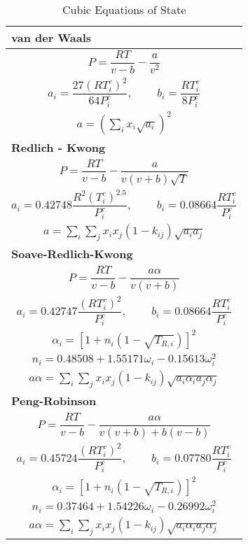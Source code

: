 \begin{table}
			\caption{Cubic Equations of State}\label{CubicEOSTable}
			\begin{center}
			\begin{tabularx}{\textwidth}{XX}
			\hline
			\textbf{van der Waals}&\\
			\hline
			\multicolumn{2}{c}{ $P = \dfrac{RT}{v - b} - \dfrac{a}{v^{2}}$}\\
			\multicolumn{2}{c}{$a_{i}  = \dfrac{27\left(RT_{i}^{c}\right)^{2}}{64P_{i}^{c}}$, $\qquad b_{i} = \dfrac{RT_{i}^{c}}{8P_{i}^{c}}$}\\
			\multicolumn{2}{c}{$a = \left(\sum_{i} x_{i} \sqrt{a_{i}}\right)^{2}$}\\
			\hline
			\textbf{Redlich - Kwong }&\\
			\hline
			\multicolumn{2}{c}{$P = \dfrac{RT}{v - b} - \dfrac{a}{v\left(v +b\right)\sqrt{T}}$}\\
			\multicolumn{2}{c}{$a_{i}  = 0.42748 \dfrac{R^{2}\left(T_{i}^{c}\right)^{2.5}}{P_{i}^{c}}$,  $\qquad b_{i} = 0.08664 \dfrac{RT_{i}^{c}}{P_{i}^{c}}$}\\
			\multicolumn{2}{c}{$a = \sum_{i}\sum_{j} x_{i}x_{j}\left(1-k_{ij}\right) \sqrt{a_{i}a_{j}} $}\\
			\hline
			\textbf{Soave-Redlich-Kwong}  & \\
			\hline
			\multicolumn{2}{c}{$P = \dfrac{RT}{v - b} - \dfrac{a \alpha }{v\left(v +b\right)}$}\\
			\multicolumn{2}{c}{$a_{i}  = 0.42747 \dfrac{\left(RT_{i}^{c}\right)^{2}}{P_{i}^{c}}$, $\qquad b_{i} = 0.08664 \dfrac{RT_{i}^{c}}{P_{i}^{c}}$}\\
			\multicolumn{2}{c}{$\alpha_{i} = \left[1+ n_{i}\left(1- \sqrt{T_{R,i}}\right)\right]^{2}$}\\
			\multicolumn{2}{c}{$n_{i} = 0.48508 + 1.55171 \omega_{i} - 0.15613 \omega_{i}^{2}$}\\
			\multicolumn{2}{c}{$a \alpha = \sum_{i}\sum_{j} x_{i}x_{j}\left(1-k_{ij}\right) \sqrt{a_{i} \alpha_{i}a_{j} \alpha_{j}} $}\\
			\hline
			\textbf{Peng-Robinson}&\\
			\hline
			\multicolumn{2}{c}{$P = \dfrac{RT}{v - b} - \dfrac{a \alpha}{v\left(v +b\right)+ b\left(v -b\right)}$}\\
			\multicolumn{2}{c}{$a_{i}  = 0.45724 \dfrac{\left(RT_{i}^{c}\right)^{2}}{P_{i}^{c}}$, $\qquad b_{i} = 0.07780 \dfrac{RT_{i}^{c}}{P_{i}^{c}}$}\\
			\multicolumn{2}{c}{$\alpha_{i} = \left[1+ n_{i}\left(1- \sqrt{T_{R,i}}\right)\right]^{2}$}\\
			\multicolumn{2}{c}{$n_{i} = 0.37464 + 1.54226 \omega_{i} - 0.26992 \omega_{i}^{2}$}\\
		    \multicolumn{2}{c}{$a \alpha = \sum_{i}\sum_{j} x_{i}x_{j}\left(1-k_{ij}\right) \sqrt{a_{i} \alpha_{i}a_{j} \alpha_{j}} $}\\
			\hline			
			\end{tabularx}
			\end{center}
\end{table}

